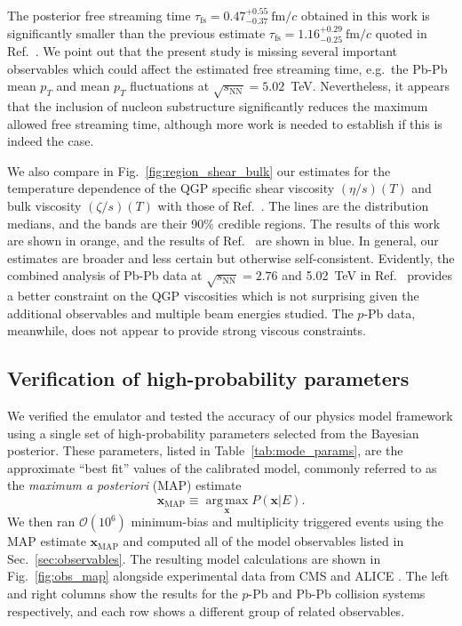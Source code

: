 \documentclass[aps,prc,reprint,amsmath,nofootinbib]{revtex4-1}
\newcommand{\sqrts}{\sqrt{s_\mathrm{NN}}}
\newcommand{\fmc}{\ensuremath{\text{fm}/c}}
\newcommand{\taufs}{\tau_\text{fs}}
\newcommand{\xv}{\mathbf x}
\newcommand{\order}[1]{$\mathcal O(10^{#1})$}
\begin{document}
The posterior free streaming time $\taufs=0.47_{-0.37}^{+0.55}~\fmc$ obtained in this work is significantly smaller than the previous estimate $\taufs=1.16_{-0.25}^{+0.29}~\fmc$ quoted in Ref.~\cite{Bernhard:2018hnz}.
We point out that the present study is missing several important observables which could affect the estimated free streaming time, e.g.\ the Pb-Pb mean $p_T$ and mean $p_T$ fluctuations at $\sqrts=5.02$~TeV.
Nevertheless, it appears that the inclusion of nucleon substructure significantly reduces the maximum allowed free streaming time, although more work is needed to establish if this is indeed the case.

We also compare in Fig.~\ref{fig:region_shear_bulk} our estimates for the temperature dependence of the QGP specific shear viscosity $(\eta/s)(T)$ and bulk viscosity $(\zeta/s)(T)$ with those of Ref.~\cite{Bernhard:2018hnz}.
The lines are the distribution medians, and the bands are their 90\% credible regions.
The results of this work are shown in orange, and the results of Ref.~\cite{Bernhard:2018hnz} are shown in blue.
In general, our estimates are broader and less certain but otherwise self-consistent.
Evidently, the combined analysis of Pb-Pb data at $\sqrts=2.76$ and 5.02~TeV in Ref.~\cite{Bernhard:2018hnz} provides a better constraint on the QGP viscosities which is not surprising given the additional observables and multiple beam energies studied.
The $p$-Pb data, meanwhile, does not appear to provide strong viscous constraints.

\subsection{Verification of high-probability parameters}

We verified the emulator and tested the accuracy of our physics model framework using a single set of high-probability parameters selected from the Bayesian posterior.
These parameters, listed in Table~\ref{tab:mode_params}, are the approximate ``best fit'' values of the calibrated model, commonly referred to as the \emph{maximum a posteriori} (MAP) estimate
\begin{equation}
  \xv_\mathrm{MAP} \equiv \operatorname*{arg\, max}_{\xv} P(\xv | E).
\end{equation}
We then ran \order{6} minimum-bias and multiplicity triggered events using the MAP estimate $\xv_\mathrm{MAP}$ and computed all of the model observables listed in Sec.~\ref{sec:observables}.
The resulting model calculations are shown in Fig.~\ref{fig:obs_map} alongside experimental data from CMS \cite{Chatrchyan:2013nka} and ALICE \cite{Adam:2015ptt, Adam:2016izf, Adam:2014qja, Abelev:2013bla}.
The left and right columns show the results for the $p$-Pb and Pb-Pb collision systems respectively, and each row shows a different group of related observables.
\end{document}
